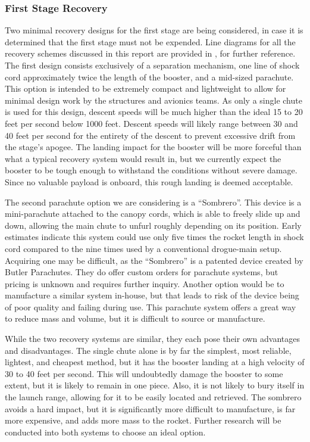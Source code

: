 \subsubsection{First Stage Recovery} %
Two minimal recovery designs for the first stage are being considered, in case it is determined that the first stage must not be expended. Line diagrams for all the recovery schemes discussed in this report are provided in , for further reference. The first design consists exclusively of a separation mechanism, one line of shock cord approximately twice the length of the booster, and a mid-sized parachute. This option is intended to be extremely compact and lightweight to allow for minimal design work by the structures and avionics teams. As only a single chute is used for this design, descent speeds will be much higher than the ideal 15 to 20 feet per second below 1000 feet. Descent speeds will likely range between 30 and 40 feet per second for the entirety of the descent to prevent excessive drift from the stage’s apogee. The landing impact for the booster will be more forceful than what a typical recovery system would result in, but we currently expect the booster to be tough enough to withstand the conditions without severe damage. Since no valuable payload is onboard, this rough landing is deemed acceptable.

The second parachute option we are considering is a ``Sombrero''. This device is a mini-parachute attached to the canopy cords, which is able to freely slide up and down, allowing the main chute to unfurl roughly depending on its position. Early estimates indicate this system could use only five times the rocket length in shock cord compared to the nine times used by a conventional drogue-main setup. Acquiring one may be difficult, as the ``Sombrero'' is a patented device created by Butler Parachutes. They do offer custom orders for parachute systems, but pricing is unknown and requires further inquiry. Another option would be to manufacture a similar system in-house, but that leads to risk of the device being of poor quality and failing during use. This parachute system offers a great way to reduce mass and volume, but it is difficult to source or manufacture.

While the two recovery systems are similar, they each pose their own advantages and disadvantages. The single chute alone is by far the simplest, most reliable, lightest, and cheapest method, but it has the booster landing at a high velocity of 30 to 40 feet per second. This will undoubtedly damage the booster to some extent, but it is likely to remain in one piece. Also, it is not likely to bury itself in the launch range, allowing for it to be easily located and retrieved. The sombrero avoids a hard impact, but it is significantly more difficult to manufacture, is far more expensive, and adds more mass to the rocket. Further research will be conducted into both systems to choose an ideal option.



